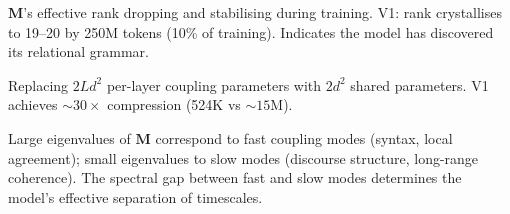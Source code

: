 \documentclass[11pt, a4paper]{article}
\newcommand{\M}{\mathbf{M}}
\theoremstyle{plain}
\theoremstyle{remark}
\begin{document}
\begin{description}[nosep, leftmargin=1.5em, style=nextline]
    \item[\textbf{Spectral crystallisation}]
    $\M$'s effective rank dropping and stabilising during training.
    V1: rank crystallises to 19--20 by 250M tokens (10\% of training).
    Indicates the model has discovered its relational grammar.

    \item[\textbf{Coupling compression}]
    Replacing $2Ld^2$ per-layer coupling parameters with $2d^2$ shared parameters.
    V1 achieves ${\sim}30\times$ compression (524K vs ${\sim}15$M).

    \item[\textbf{Fast modes / slow modes}]
    Large eigenvalues of $\M$ correspond to fast coupling modes (syntax, local agreement); small eigenvalues to slow modes (discourse structure, long-range coherence).
    The spectral gap between fast and slow modes determines the model's effective separation of timescales.

\end{description}

\end{document}
